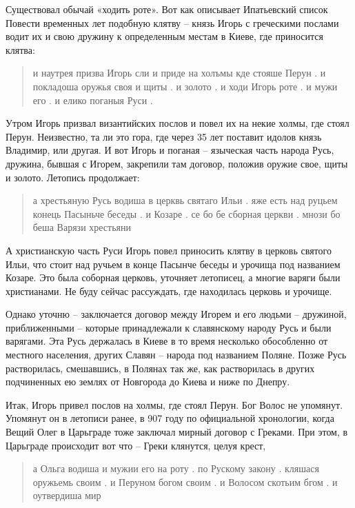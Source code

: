 \documentclass[a5paper,11pt,openany]{article}
\begin{document}
Существовал обычай «ходить роте». Вот как описывает Ипатьевский список Повести временных лет подобную клятву – князь Игорь с греческими послами водит их и свою дружину к определенным местам в Киеве, где приносится клятва:

\begin{quotation}
\noindent и наутрея призва Игорь сли и приде на холъмы кде стояше Перун . и покладоша
оружья своя и щиты . и золото . и ходи Игорь роте . и мужи его . и елико поганыя Руси .
\end{quotation} 

Утром Игорь призвал византийских послов и повел их на некие холмы, где стоял Перун. Неизвестно, та ли это гора, где через 35 лет поставит идолов князь Владимир, или другая. И вот Игорь и поганая – языческая часть народа Русь, дружина, бывшая с Игорем, закрепили там договор, положив оружие свое, щиты и золото. 
Летопись продолжает:

\begin{quotation}
\noindent а хрестьяную Русь водиша в церквь святаго Ильи . яже есть над руцьем конець Пасыньче  беседы . и Козаре . се бо бе сборная церкви . мнози бо беша Варязи хрестьяни 
\end{quotation}

А христианскую часть Руси Игорь повел приносить клятву в церковь святого Ильи, что стоит над ручьем в конце Пасынче беседы и урочища под названием Козаре. Это была соборная церковь, уточняет летописец, а многие варяги были христианами. Не буду сейчас рассуждать, где находилась церковь и урочище.

Однако уточню – заключается договор между Игорем и его людьми – дружиной, приближенными – которые принадлежали к славянскому народу Русь и были варягами. Эта Русь держалась в Киеве в то время несколько обособленно от местного населения, других Славян – народа под названием Поляне. Позже Русь растворилась, смешавшись, в Полянах так же, как растворилась в других подчиненных ею землях от Новгорода до Киева и ниже по Днепру.

    Итак, Игорь привел послов на холмы, где стоял Перун. Бог Волос не упомянут. Упомянут он в летописи ранее, в 907 году по официальной хронологии, когда Вещий Олег в Царьграде тоже заключал мирный договор с Греками. При этом, в Царьграде происходит вот что – Греки клянутся, целуя крест, 

\begin{quotation}
\noindent а Ольга водиша и мужии его на роту . по Рускому закону . кляшася оружьемь своим . и Перуном богом своим . и Волосом скотьим бгом . и оутвердиша мир
\end{quotation}
\end{document}
